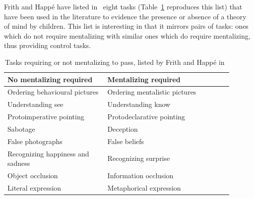 \documentclass{sig-alternate}
\begin{document}
Frith and Happé have listed in~\cite{frith1994autism} eight tasks
(Table~\ref{mentalizing-tasks} reproduces this list) that have been
used in the literature to evidence the presence or absence of a theory of mind
by children. This list is interesting in that it mirrors pairs of tasks: ones
which do not require mentalizing with similar ones which do require mentalizing,
thus providing control tasks.

\begin{table}[h]
    \centering
    \begin{tabular}{p{0.4\linewidth}p{0.5\linewidth}}
        \toprule
        No mentalizing required           & Mentalizing required          \\
        \midrule
        Ordering behavioural pictures     & Ordering mentalistic pictures~\cite{baron1986mechanical} \\
        Understanding see                 & Understanding know~\cite{perner1989exploration}            \\
        Protoimperative pointing          & Protodeclarative pointing~\cite{baron1989perceptual}     \\
        Sabotage                          & Deception~\cite{sodian1992deception}                     \\
        False photographs                 & False beliefs~\cite{leslie1992domain}                 \\
        Recognizing happiness and sadness & Recognizing surprise~\cite{baron1993children}          \\
        Object occlusion                  & Information occlusion~\cite{baron1992out}         \\
        Literal expression                & Metaphorical expression~\cite{happe1993communicative}       \\
        \bottomrule
    \end{tabular}
    \caption{\small Tasks requiring or not mentalizing to pass, listed by Frith and Happé in~\cite{frith1994autism}}
    \label{mentalizing-tasks}
\end{table}
\end{document}
